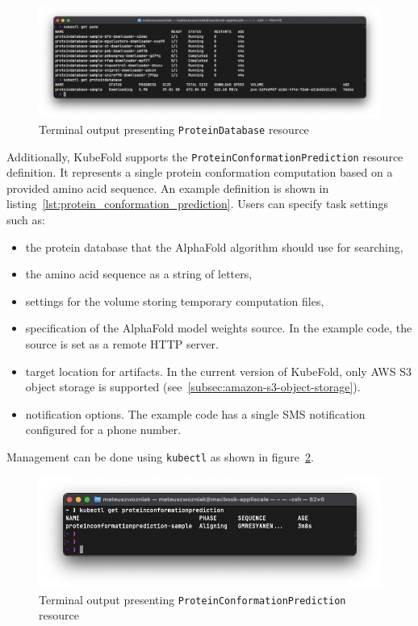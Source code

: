 \begin{figure}[htbp]
    \centering
    \includegraphics[width=\textwidth]{images/old_proteindatabase_terminal}
    \caption{Terminal output presenting \texttt{ProteinDatabase} resource}
    \label{fig:proteindatabase_terminal}
\end{figure}

Additionally, KubeFold supports the \texttt{ProteinConformationPrediction} resource definition.
It represents a single protein conformation computation based on a provided amino acid sequence.
An example definition is shown in listing~\ref{lst:protein_conformation_prediction}.
Users can specify task settings such as:
\begin{itemize}
    \item the protein database that the AlphaFold algorithm should use for searching,
    \item the amino acid sequence as a string of letters,
    \item settings for the volume storing temporary computation files,
    \item specification of the AlphaFold model weights source.
    In the example code, the source is set as a remote HTTP server.
    \item target location for artifacts.
    In the current version of KubeFold, only AWS S3 object storage is supported (see~\ref{subsec:amazon-s3-object-storage}).
    \item notification options.
    The example code has a single SMS notification configured for a phone number.
\end{itemize}
Management can be done using \texttt{kubectl} as shown in figure~\ref{fig:proteinconformationprediction_terminal}.

\begin{figure}[htbp]
    \centering
    \includegraphics[width=\textwidth]{images/old_proteinconformationprediction_terminal}
    \caption{Terminal output presenting \texttt{ProteinConformationPrediction} resource}
    \label{fig:proteinconformationprediction_terminal}
\end{figure}

